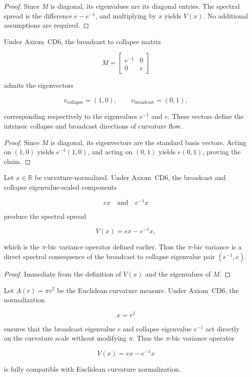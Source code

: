 \documentclass[final,onefignum,onetabnum]{siamart}
\begin{document}
\begin{proof}
Since $M$ is diagonal, its eigenvalues are its diagonal entries. The spectral spread is the difference $e - e^{-1}$, and multiplying by $x$ yields $V(x)$. No additional assumptions are required.
\end{proof}

\begin{corollary}
Under Axiom~CD6, the broadcast to collapse matrix

\[
M =
\begin{bmatrix}
e^{-1} & 0 \\
0 & e
\end{bmatrix}
\]

admits the eigenvectors

\[
v_{\text{collapse}} = (1,0), \qquad
v_{\text{broadcast}} = (0,1),
\]

corresponding respectively to the eigenvalues $e^{-1}$ and $e$. These vectors define the intrinsic collapse and broadcast directions of curvature flow.
\end{corollary}

\begin{proof}
Since $M$ is diagonal, its eigenvectors are the standard basis vectors. Acting on $(1,0)$ yields $e^{-1}(1,0)$, and acting on $(0,1)$ yields $e(0,1)$, proving the claim.
\end{proof}

\begin{corollary}
Let $x \in \mathbb{R}$ be curvature-normalized. Under Axiom~CD6, the broadcast and collapse eigenvalue-scaled components

\[
e x \quad \text{and} \quad e^{-1} x
\]

produce the spectral spread

\[
V(x) = e x - e^{-1} x,
\]

which is the $\pi$-bic variance operator defined earlier. Thus the $\pi$-bic variance is a direct spectral consequence of the broadcast to collapse eigenvalue pair $(e^{-1}, e)$.
\end{corollary}

\begin{proof}
Immediate from the definition of $V(x)$ and the eigenvalues of $M$.
\end{proof}

\begin{corollary}
Let $A(r) = \pi r^{2}$ be the Euclidean curvature measure. Under Axiom~CD6, the normalization

\[
x = r^{2}
\]

ensures that the broadcast eigenvalue $e$ and collapse eigenvalue $e^{-1}$ act directly on the curvature scale without modifying $\pi$. Thus the $\pi$-bic variance operator

\[
V(x) = e x - e^{-1} x
\]

is fully compatible with Euclidean curvature normalization.
\end{corollary}
\end{document}
